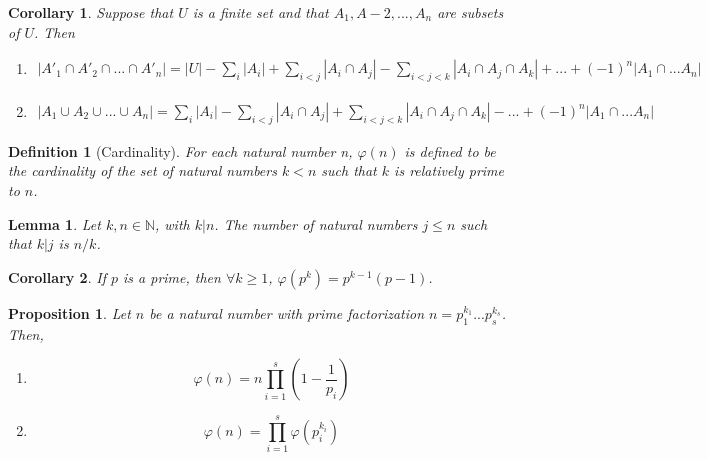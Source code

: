 \documentclass[12pt]{article}
\newtheorem{definition}{Definition}[subsection]
\newtheorem{proposition}{Proposition}[subsection]
\newtheorem{lemma}{Lemma}[subsection]
\newtheorem{corollary}{Corollary}[subsection]
\begin{document}
    \begin{corollary}
        Suppose that $U$ is a finite set and that $A_1, A-2, ..., A_n$ are subsets of $U$. Then
        \begin{enumerate}
            \item
                \begin{multline}
                    |A'_1\cap A'_2\cap ...\cap A'_n| = |U|-\sum_i|A_i|+\sum_{i<j}|A_i \cap A_j| - \sum_{i < j < k}|A_i \cap A_j \cap A_k| + ... +(-1)^n |A_1 \cap ... A_n|
                \end{multline}
            \item
                \begin{multline}
                    |A_1\cup A_2\cup ... \cup A_n| = \sum_i |A_i| - \sum_{i<j}|A_i \cap A_j| + \sum_{i < j < k}|A_i \cap A_j \cap A_k| - ... +(-1)^n |A_1 \cap ... A_n|
                \end{multline}

        \end{enumerate}

    \end{corollary}
    \begin{definition}[Cardinality]
        For each natural number n, $\varphi(n)$ is defined to be the cardinality of the set of natural numbers $k < n$ such that $k$ is relatively prime to $n$. 
    \end{definition}
    \begin{lemma}
        Let $k, n \in \mathbb{N}$, with $k|n$. The number of natural numbers $j \leq n$ such that $k|j$ is $n/k$.
    \end{lemma}
    \begin{corollary}
        If $p$ is a prime, then $\forall k \geq 1$, $\varphi(p^k) = p^{k-1}(p-1)$.
    \end{corollary}
    \begin{proposition}
        Let $n$ be a natural number with prime factorization $n=p^{k_1}_1...p^{k_s}_s$. Then,
        \begin{enumerate}
            \item 
                \begin{equation}
                    \varphi(n)=n\prod_{i=1}^s (1-\frac{1}{p_i})
                \end{equation}
            \item
                \begin{equation}
                    \varphi(n)=\prod_{i=1}^s \varphi(p^{k_i}_i)
                \end{equation}
        \end{enumerate}
    \end{proposition}
\end{document}
